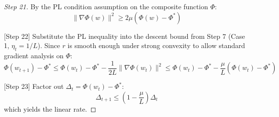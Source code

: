 \documentclass{article}
\begin{document}
\begin{proof}
[Step 21] By the PL condition assumption on the composite function $\Phi$:
\begin{equation}
    \|\nabla \Phi(w)\|^2 \geq 2\mu (\Phi(w) - \Phi^*)
\end{equation}

[Step 22] Substitute the PL inequality into the descent bound from Step 7 (Case 1, $\eta_t = 1/L$). Since $r$ is smooth enough under strong convexity to allow standard gradient analysis on $\Phi$:
\begin{equation}
    \Phi(w_{t+1}) - \Phi^* \leq \Phi(w_t) - \Phi^* - \frac{1}{2L} \|\nabla \Phi(w_t)\|^2 \leq \Phi(w_t) - \Phi^* - \frac{\mu}{L} (\Phi(w_t) - \Phi^*)
\end{equation}

[Step 23] Factor out $\Delta_t = \Phi(w_t) - \Phi^*$:
\begin{equation}
    \Delta_{t+1} \leq \left(1 - \frac{\mu}{L}\right) \Delta_t
\end{equation}
which yields the linear rate.
\end{proof}
\end{document}
